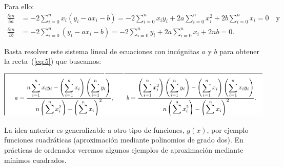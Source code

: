  Para ello:
 \begin{align*}
   \frac{\partial m}{\partial a} & = 
   -2\sum_{i=0}^n
   x_i\left(
     y_i - a x_i - b
   \right) = 
   -2\sum_{i=0}^n x_i y_i
   +2a\sum_{i=0}^n x_i^2
   +2b\sum_{i=0}^n x_i
   = 0
   \quad \text{y} \\
   \frac{\partial m}{\partial b} & = 
   -2\sum_{i=0}^n
   \left(
     y_i - a x_i - b
   \right) = 
   -2\sum_{i=0}^n  y_i
   +2a\sum_{i=0}^n x_i
   +2nb
   = 0.
 \end{align*}

 Basta resolver este sistema lineal de ecuaciones con incógnitas $a$ y
 $b$ para obtener la recta~(\ref{eq:5}) que buscamos:
 \begin{center}
   \includegraphics[width=0.9\linewidth]{tema2/ecuacion-min-cuadr}
 \end{center}

 La idea anterior es generalizable a otro tipo de funciones, $g(x)$,
 por ejemplo funciones cuadráticas (aproximación mediante polinomios de
 grado dos).  En prácticas de ordenador veremos algunos ejemplos de
 aproximación mediante mínimos cuadrados.

